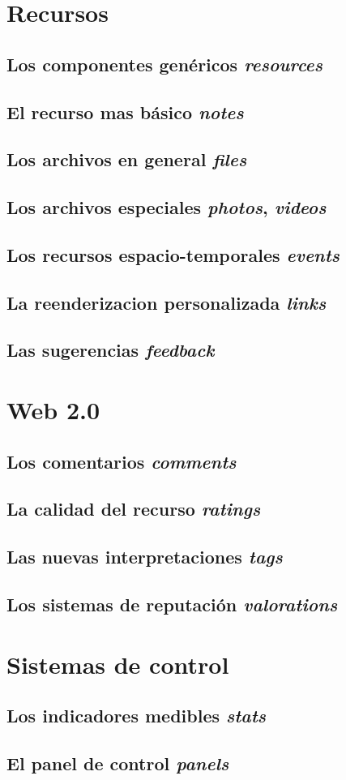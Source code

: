 \section{Recursos}
\subsection{Los componentes genéricos \emph{resources}}
\subsection{El recurso mas básico \emph{notes}}
\subsection{Los archivos en general \emph{files}}
\subsection{Los archivos especiales \emph{photos}, \emph{videos}}
\subsection{Los recursos espacio-temporales \emph{events}}
\subsection{La reenderizacion personalizada \emph{links}}
\subsection{Las sugerencias \emph{feedback}}

\section{Web 2.0}
\subsection{Los comentarios \emph{comments}}
\subsection{La calidad del recurso \emph{ratings}}
\subsection{Las nuevas interpretaciones \emph{tags}}
\subsection{Los sistemas de reputación \emph{valorations}}

\section{Sistemas de control}
\subsection{Los indicadores medibles \emph{stats}}
\subsection{El panel de control \emph{panels}}
